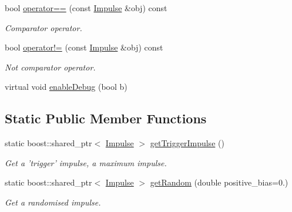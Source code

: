\begin{DoxyCompactItemize}
bool \hyperlink{classcryomesh_1_1components_1_1Impulse_a8351a5a0e6afc72fa26ab306226ccab0}{operator==} (const \hyperlink{classcryomesh_1_1components_1_1Impulse}{\-Impulse} \&obj) const 
\begin{DoxyCompactList}\small\item\em \-Comparator operator. \end{DoxyCompactList}\item 
bool \hyperlink{classcryomesh_1_1components_1_1Impulse_ac26da063e408d5493cd33f2014dfa875}{operator!=} (const \hyperlink{classcryomesh_1_1components_1_1Impulse}{\-Impulse} \&obj) const 
\begin{DoxyCompactList}\small\item\em \-Not comparator operator. \end{DoxyCompactList}\item 
virtual void \hyperlink{classcryomesh_1_1components_1_1Impulse_ad3a3e47e23c5443a9df0df9c3c53a8ac}{enable\-Debug} (bool b)
\end{DoxyCompactItemize}
\subsection*{\-Static \-Public \-Member \-Functions}
\begin{DoxyCompactItemize}
\item 
static boost\-::shared\-\_\-ptr$<$ \hyperlink{classcryomesh_1_1components_1_1Impulse}{\-Impulse} $>$ \hyperlink{classcryomesh_1_1components_1_1Impulse_ae88e7ff0cacf1ca6f323f66c97819c7a}{get\-Trigger\-Impulse} ()
\begin{DoxyCompactList}\small\item\em \-Get a 'trigger' impulse, a maximum impulse. \end{DoxyCompactList}\item 
static boost\-::shared\-\_\-ptr$<$ \hyperlink{classcryomesh_1_1components_1_1Impulse}{\-Impulse} $>$ \hyperlink{classcryomesh_1_1components_1_1Impulse_a9433c8dbc841beb6e3bfa63dd99ed838}{get\-Random} (double positive\-\_\-bias=0.)
\begin{DoxyCompactList}\small\item\em \-Get a randomised impulse. \end{DoxyCompactList}\end{DoxyCompactItemize}
